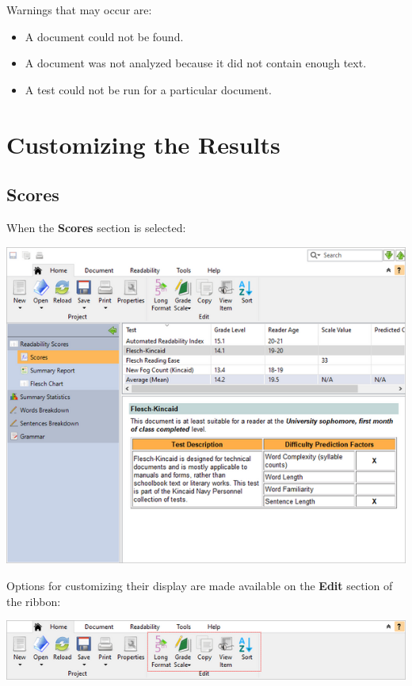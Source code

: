 \documentclass[
]{book}
\providecommand{\tightlist}{%
  \setlength{\itemsep}{0pt}\setlength{\parskip}{0pt}}
\theoremstyle{definition}
\theoremstyle{definition}
\theoremstyle{definition}
\theoremstyle{definition}
\theoremstyle{remark}
\begin{document}
Warnings that may occur are:

\begin{itemize}
\tightlist
\item
  A document could not be found.
\item
  A document was not analyzed because it did not contain enough text.
\item
  A test could not be run for a particular document.
\end{itemize}

\hypertarget{customizing-the-results}{%
\chapter{Customizing the Results}\label{customizing-the-results}}

\hypertarget{scores}{%
\section{Scores}\label{scores}}

When the \textbf{Scores} section is selected:

\includegraphics{Images/featuresscores.png}

Options for customizing their display are made available on the \textbf{Edit} section of the ribbon:

\includegraphics{Images/RibbonEditScores.png}
\end{document}
